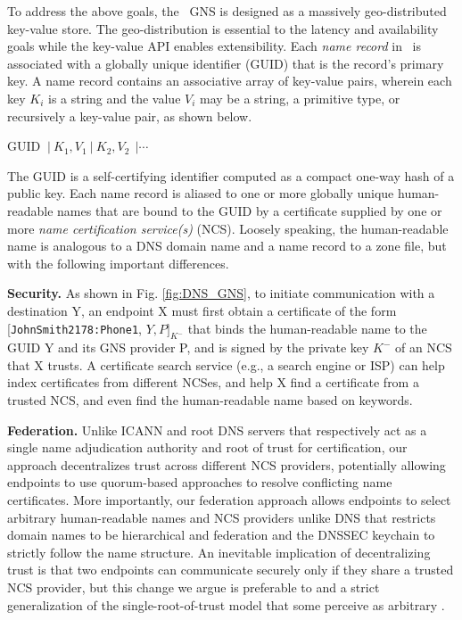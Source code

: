 To address the above goals, the \auspice\ GNS is designed as a massively geo-distributed key-value store. The geo-distribution is essential to the latency and availability goals while the key-value API enables extensibility. Each {\em name record} in \auspice\ is associated with a globally unique identifier (GUID) that is the record's primary key. A name record contains an associative array of key-value pairs, wherein each key $K_i$ is a string and the value $V_i$ may be a string, a primitive type, or recursively a key-value pair, as shown below.

GUID  $\ | \ K_1, V_1 \ | \ K_2, V_2 \ \ | \cdots $

The GUID is a self-certifying identifier computed as a compact one-way hash of a public key. Each name record is aliased to one or more globally unique human-readable names that are bound to the GUID by a certificate supplied by one or more {\em name certification service(s)} (NCS). Loosely speaking, the human-readable name is analogous to a DNS domain name and a name record to a zone file, but with the following important differences.

{\bf{Security.}} As shown in Fig. \ref{fig:DNS_GNS}, to initiate communication with a destination Y, an endpoint X must first obtain a certificate of the form [\verb+JohnSmith2178:Phone1+, $Y, P]_{K^-}$ that binds the human-readable name to the GUID Y and its GNS provider P, and is signed by the private key $K^-$ of an NCS that X trusts. A certificate search service (e.g., a search engine or ISP) can help index certificates from different NCSes, and help X find a certificate from a trusted NCS, and even find the human-readable name based on keywords. 

{\bf{Federation.}} Unlike ICANN and root DNS servers that respectively act as a single name adjudication authority and root of trust for certification, our approach decentralizes trust across different NCS providers, potentially allowing endpoints to use quorum-based approaches to resolve conflicting name certificates. More importantly, our federation approach allows endpoints to select arbitrary human-readable names and NCS providers unlike DNS that restricts domain names to be hierarchical and federation and the DNSSEC keychain to strictly follow the name structure. An inevitable implication of decentralizing trust is that two endpoints can communicate securely only if they share a trusted NCS provider, but this change we argue is preferable to and a strict generalization of the single-root-of-trust model that some perceive as arbitrary \cite{ICANN-debate-Sems,ICANN-debate-Gross}.

